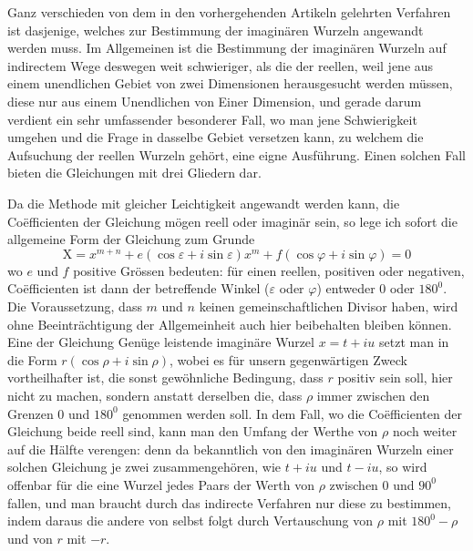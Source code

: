 Ganz verschieden von dem in den vorhergehenden Artikeln gelehrten Verfahren ist dasjenige, welches zur Bestimmung der imaginären Wurzeln angewandt
werden muss. Im Allgemeinen ist die Bestimmung der imaginären Wurzeln auf
indirectem Wege deswegen weit schwieriger, als die der reellen, weil jene aus
einem unendlichen Gebiet von zwei Dimensionen herausgesucht werden müssen,
diese nur aus einem Unendlichen von Einer Dimension, und gerade darum verdient ein sehr umfassender besonderer Fall, wo man jene Schwierigkeit umgehen
und die Frage in dasselbe Gebiet versetzen kann, zu welchem die Aufsuchung
der reellen Wurzeln gehört, eine eigne Ausführung. Einen solchen Fall bieten
die Gleichungen mit drei Gliedern dar.

Da die Methode mit gleicher Leichtigkeit angewandt werden kann, die Coëfficienten der Gleichung mögen reell oder imaginär sein, so lege ich sofort die allgemeine Form der Gleichung zum Grunde
\[
\mathrm{X}=x^{m+n}+e(\cos\varepsilon+i\sin\varepsilon)x^m+f(\cos\varphi+i\sin\varphi)=0
\]
wo $e$ und $f$ positive Grössen bedeuten: für einen reellen, positiven oder negativen, Coëfficienten ist dann der betreffende Winkel ($\varepsilon$ oder $\varphi$) entweder $0$ oder
$180^{0}$. Die Voraussetzung, dass $m$ und $n$ keinen gemeinschaftlichen Divisor haben, wird ohne Beeinträchtigung der Allgemeinheit auch hier beibehalten bleiben können. Eine der Gleichung Genüge leistende imaginäre Wurzel $x=t+iu$
setzt man in die Form $r(\cos\rho+i\sin\rho)$, wobei es für unsern gegenwärtigen Zweck
vortheilhafter ist, die sonst gewöhnliche Bedingung, dass $r$ positiv sein soll, hier
nicht zu machen, sondern anstatt derselben die, dass $\rho$ immer zwischen den Grenzen $0$ und $180^{0}$ genommen werden soll. In dem Fall, wo die Coëfficienten der
Gleichung beide reell sind, kann man den Umfang der Werthe von $\rho$ noch weiter auf die Hälfte verengen: denn da bekanntlich von den imaginären Wurzeln
einer solchen Gleichung je zwei zusammengehören, wie $t+iu$ und $t-iu$, so
wird offenbar für die eine Wurzel jedes Paars der Werth von $\rho$ zwischen $0$ und
$90^{0}$ fallen, und man braucht durch das indirecte Verfahren nur diese zu bestimmen, indem daraus die andere von selbst folgt durch Vertauschung von $\rho$ mit
$180^{0}-\rho$ und von $r$ mit $-r$.

